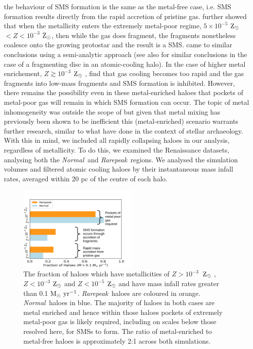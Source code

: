 \documentclass[graphics, twocolumn, usenatbib]{mn2e}
\newcommand{\msolaryrc} {$\rm{M_{\odot}~yr^{-1}}$}
\newcommand{\zsolar} {$\rm{Z_{\odot}}~$}
\newcommand{\zsolarc} {$\rm{Z_{\odot}}$}
\newcommand{\rarepeak} {\textit{Rarepeak~}}
\newcommand{\normal} {\textit{Normal~}}
\begin{document}
the behaviour of SMS formation is the same as the metal-free case, i.e. SMS formation results
directly from the rapid accretion of pristine gas. 
\cite{Chon_2020} further showed that when the metallicity enters the
extremely metal-poor regime, $5 \times 10^{-5}$ \zsolar $ < Z < 10^{-3}$ \zsolarc, then while
the gas does fragment, the fragments nonetheless coalesce onto the growing protostar and the
result is a SMS. 
\cite{Tagawa_2020} came to similar conclusions
using a semi-analytic approach (see also \citealt{Inayoshi_2014b} for similar conclusions in the case of a fragmenting disc in an atomic-cooling halo).
In the case of higher metal enrichement,  $Z \gtrsim 10^{-3}$ \zsolar,
\citet{Chon_2020} find that gas cooling becomes too rapid and the gas fragments into low-mass fragments
and SMS formation is inhibited. However, there remains the possibility even in these
metal-enriched haloes that pockets of metal-poor gas will remain in which SMS formation can occur.
The topic of metal inhomogeneity was outside the scope of  \cite{Chon_2020} 
but given that metal mixing has previously been shown to be inefficient
\citep[e.g.][]{Smith_2015} this (metal-enriched) scenario warrants further research, similar to 
what \cite{Tarumi_2020} have done in the context of stellar archaeology. \\
\indent With this in mind, we included all rapidly collapsing haloes in our analysis, regardless of
metallicity. To do this, we examined the Renaissance datasets, analysing
both the \normal and \rarepeak regions. We analysed the simulation volumes and filtered atomic
cooling haloes by their instantaneous mass infall rates, averaged within 20 pc of the centre of each halo.  \\
\begin{figure}
   \centering 
\includegraphics[width=0.525\textwidth]{FIGURES/FinalPlot-crop.pdf}
\caption{The fraction of haloes which have metallicities of $Z > 10^{-3}$~\zsolar,
  $Z < 10^{-3}$ \zsolar and $ Z < 10^{-5}$ \zsolar and have mass infall rates greater than
  0.1 \msolaryrc. \rarepeak haloes are coloured in orange. \normal haloes in blue. 
  The majority of haloes in both cases are metal enriched and hence within
  those haloes pockets of extremely metal-poor gas 
  is likely required, including on scales below those resolved here, for SMSs to form. The
  ratio of metal-enriched to metal-free haloes is approximately 2:1 across both simulations.} \label{Fig:Fractions}
\end{figure}
\end{document}
